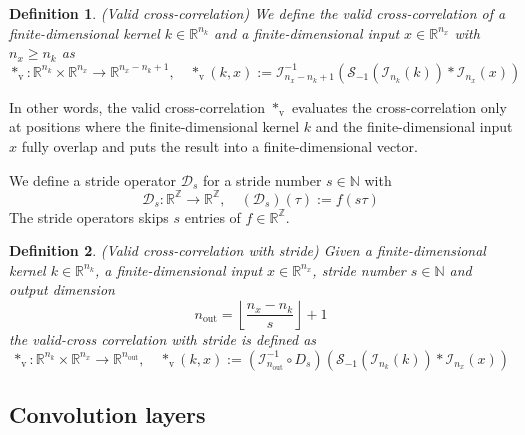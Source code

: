 \documentclass[twoside,a4paper]{article}
\newtheorem{definition}{Definition}
\begin{document}
\begin{definition}
	(Valid cross-correlation)
	We define the valid cross-correlation of a finite-dimensional kernel $k \in \mathbb{R}^{n_k}$ and 
	a finite-dimensional input $x \in \mathbb{R}^{n_x}$ with $n_x \geq n_k$ as
	\begin{equation*}
		*_{\text{v}} : \mathbb{R}^{n_k} \times \mathbb{R}^{n_x} \to \mathbb{R}^{n_x-n_k+1},
		\quad *_{\text{v}}(k,x) := \mathcal{I}_{n_x-n_k+1}^{-1} (
			\mathcal{S}_{-1}( \mathcal{I}_{n_k}(k)) * \mathcal{I}_{n_x}(x)
		)
	\end{equation*}
\end{definition}
In other words, the valid cross-correlation $*_{\text{v}}$ evaluates the cross-correlation 
only at positions where the finite-dimensional kernel $k$ and the 
finite-dimensional input $x$ fully overlap and puts the result into a finite-dimensional vector.


We define a stride operator $\mathcal{D}_s$ for a stride number $s \in \mathbb{N}$ with
\begin{equation*}
	\mathcal{D}_s : \mathbb{R}^{\mathbb{Z}} \to \mathbb{R}^{\mathbb{Z}},
	\quad (\mathcal{D}_s)(\tau) := f(s \tau)
\end{equation*}
The stride operators skips $s$ entries of $f \in \mathbb{R}^\mathbb{Z}$.

\begin{definition}
	(Valid cross-correlation with stride)
	Given a finite-dimensional kernel $k \in \mathbb{R}^{n_k}$, a finite-dimensional
	input $x \in \mathbb{R}^{n_x}$, stride number $s \in \mathbb{N}$ and output dimension
	\begin{equation*}
		n_{\text{out}} = \left\lfloor \frac{n_x - n_k}{s} \right\rfloor + 1
	\end{equation*}
	the valid-cross correlation with stride is defined as
	\begin{equation*}
		*_{\text{v}} : \mathbb{R}^{n_k} \times \mathbb{R}^{n_x} \to \mathbb{R}^{n_{\text{out}}},
		\quad *_{\text{v}}(k,x) := 
		(\mathcal{I}_{n_{\text{out}}}^{-1} \circ D_s)
		(
			\mathcal{S}_{-1}( \mathcal{I}_{n_k}(k)) * \mathcal{I}_{n_x}(x)
		)
	\end{equation*}
\end{definition}


\subsection{Convolution layers}
\end{document}
